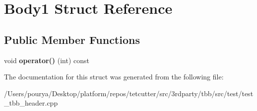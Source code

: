 \hypertarget{structBody1}{}\section{Body1 Struct Reference}
\label{structBody1}
\subsection*{Public Member Functions}
\begin{DoxyCompactItemize}
\item 
\hypertarget{structBody1_a1e82625ac4f8131ad3ca086c14c8d263}{}void {\bfseries operator()} (int) const \label{structBody1_a1e82625ac4f8131ad3ca086c14c8d263}

\end{DoxyCompactItemize}


The documentation for this struct was generated from the following file\+:\begin{DoxyCompactItemize}
\item 
/\+Users/pourya/\+Desktop/platform/repos/tetcutter/src/3rdparty/tbb/src/test/test\+\_\+tbb\+\_\+header.\+cpp\end{DoxyCompactItemize}
